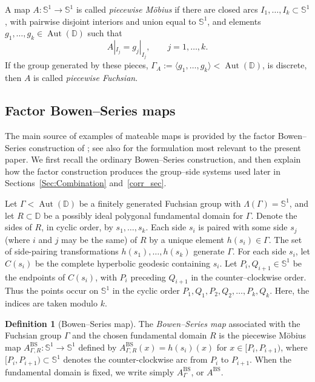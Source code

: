 \documentclass[11pt,a4paper, oneside]{amsart}
\theoremstyle{definition}
\newtheorem{defn}[thm]{Definition}
\theoremstyle{remark}
\DeclareMathOperator{\Aut}{Aut}
\numberwithin{equation}{section}
\def\D{{\mathbb{D}}}
\newcommand{\Circle}{{{\mathbb S}^1}}
\begin{document}
A map $A:\Circle\to\Circle$ is called \emph{piecewise M\"obius}
if there are closed arcs $I_1,\ldots,I_k\subset\Circle$, with pairwise disjoint
interiors and union equal to $\Circle$, and elements
$g_1,\ldots,g_k\in\Aut(\D)$ such that
\[
A|_{I_j}=g_j|_{I_j},
\qquad
j=1,\ldots,k.
\]
If the group generated by these pieces,
$\Gamma_A:=\langle g_1,\ldots,g_k\rangle<\Aut(\D)$, is discrete, then $A$ is
called \emph{piecewise Fuchsian}.

\subsection{Factor Bowen--Series maps}
\label{SSec:FactorBowenSeriesMaps}

The main source of examples of mateable maps is provided by the factor
Bowen--Series construction of \cite{MM_survey,MM,MV25}; see also \cite[\S 13]{LLM24} for the formulation most relevant to the present paper.  We first recall the
ordinary Bowen--Series construction, and then explain how the factor
construction produces the group--side systems used later in
Sections~\ref{Sec:Combination} and~\ref{corr_sec}.

Let $\Gamma<\Aut(\D)$ be a finitely generated Fuchsian group with $\Lambda(\Gamma)=\mathbb{S}^1$,
and let $R\subset\D$ be a possibly ideal polygonal fundamental domain for
$\Gamma$. Denote the sides of $R$,
in cyclic order, by $s_1,\ldots,s_k$. Each side $s_i$ is paired with some side $s_j$ (where $i$ and $j$ may be the same) of $R$ by a unique element $h(s_i)\in\Gamma$. The set
of side-pairing transformations $h(s_1),\ldots,h(s_k)$ generate
$\Gamma$. For each side $s_i$, let $C(s_i)$ be the complete hyperbolic geodesic containing $s_i$. Let $P_i,Q_{i+1}\in\mathbb S^1$ be the endpoints of $C(s_i)$, with $P_i$ preceding $Q_{i+1}$ in the counter--clockwise order. Thus the points occur on $\mathbb S^1$ in the cyclic order $P_1,Q_1,P_2,Q_2,\ldots,P_k,Q_k$. Here, the indices are taken
modulo $k$. 



\begin{defn}[Bowen--Series map]
	\label{Def:BowenSeriesMap}
	The \emph{Bowen--Series map} associated with the Fuchsian group
	$\Gamma$ and the chosen fundamental domain $R$ is the piecewise M\"obius
	map $A_{\Gamma,R}^{\mathrm{BS}}:\mathbb S^1\to\mathbb S^1$ defined by
	$A_{\Gamma,R}^{\mathrm{BS}}(x)=h(s_i)(x)$ for
	$x\in [P_i,P_{i+1})$, where $[P_i,P_{i+1})\subset\mathbb S^1$ denotes
	the counter-clockwise arc from $P_i$ to $P_{i+1}$. When the fundamental
	domain is fixed, we write simply $A_{\Gamma}^{\mathrm{BS}}$, or
	$A^{\mathrm{BS}}$.
\end{defn}
\end{document}
